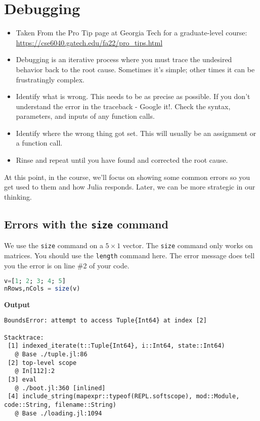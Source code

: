 \section{Debugging}

\vspace*{.2cm}

\begin{tcolorbox}[title={\large \bf What is Debugging All About?}]

    \begin{itemize}
        \item Taken From the Pro Tip page at Georgia Tech for a graduate-level course: \url{https://cse6040.gatech.edu/fa22/pro_tips.html}

        \item Debugging is an iterative process where you must trace the undesired behavior back to the root cause. Sometimes it's simple; other times it can be frustratingly complex.

        \item Identify what is wrong. This needs to be as precise as possible. If you don't understand the error in the traceback - Google it!. Check the syntax, parameters, and inputs of any function calls.

        \item Identify where the wrong thing got set. This will usually be an assignment or a function call.

        \item Rinse and repeat until you have found and corrected the root cause.
    \end{itemize}
    \end{tcolorbox}

At this point, in the course, we'll focus on showing some common errors so you get used to them and how Julia responds. Later, we can be more strategic in our thinking.\\

\subsection{Errors with the \texttt{size} command}
We use the \texttt{size} command on a $ 5 \times 1$ vector. The \texttt{size} command only works on matrices. You should use the \texttt{length} command here. The error message does tell you the error is on line \#2 of your code.
\begin{lstlisting}[language=Julia,style=mystyle]
v=[1; 2; 3; 4; 5]
nRows,nCols = size(v)
\end{lstlisting}
\textbf{Output} 
\begin{verbatim}
BoundsError: attempt to access Tuple{Int64} at index [2]

Stacktrace:
 [1] indexed_iterate(t::Tuple{Int64}, i::Int64, state::Int64)
   @ Base ./tuple.jl:86
 [2] top-level scope
   @ In[112]:2
 [3] eval
   @ ./boot.jl:360 [inlined]
 [4] include_string(mapexpr::typeof(REPL.softscope), mod::Module, code::String, filename::String)
   @ Base ./loading.jl:1094

\end{verbatim}

